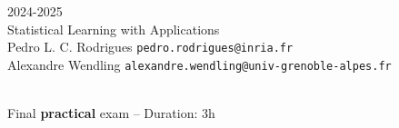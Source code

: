 \begin{flushleft}
 \hfill {} 2024-2025 \\
Statistical Learning with Applications \\
Pedro L. C. Rodrigues   \hfill  \texttt{pedro.rodrigues@inria.fr} \\
Alexandre Wendling \hfill \texttt{alexandre.wendling@univ-grenoble-alpes.fr} \\

\HRuleTop\\
\begin{center}
\Large{Final \textbf{practical} exam -- Duration: 3h}
\end{center}
\HRuleBottom
\end{flushleft}
